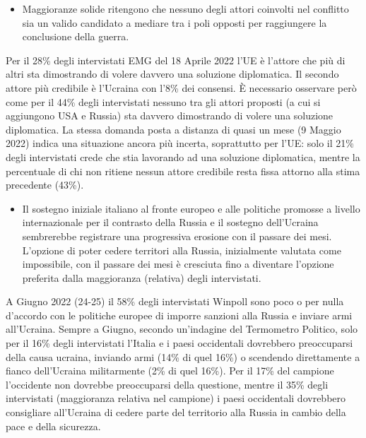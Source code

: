 \documentclass[
]{book}
\providecommand{\tightlist}{%
  \setlength{\itemsep}{0pt}\setlength{\parskip}{0pt}}
\begin{document}
\begin{itemize}
\tightlist
\item
  Maggioranze solide ritengono che nessuno degli attori coinvolti nel conflitto sia un valido candidato a mediare tra i poli opposti per raggiungere la conclusione della guerra.
\end{itemize}

Per il 28\% degli intervistati EMG del 18 Aprile 2022 l'UE è l'attore che più di altri sta dimostrando di volere davvero una soluzione diplomatica. Il secondo attore più credibile è l'Ucraina con l'8\% dei consensi. È necessario osservare però come per il 44\% degli intervistati nessuno tra gli attori proposti (a cui si aggiungono USA e Russia) sta davvero dimostrando di volere una soluzione diplomatica. La stessa domanda posta a distanza di quasi un mese (9 Maggio 2022) indica una situazione ancora più incerta, soprattutto per l'UE: solo il 21\% degli intervistati crede che stia lavorando ad una soluzione diplomatica, mentre la percentuale di chi non ritiene nessun attore credibile resta fissa attorno alla stima precedente (43\%).

\begin{itemize}
\tightlist
\item
  Il sostegno iniziale italiano al fronte europeo e alle politiche promosse a livello internazionale per il contrasto della Russia e il sostegno dell'Ucraina sembrerebbe registrare una progressiva erosione con il passare dei mesi. L'opzione di poter cedere territori alla Russia, inizialmente valutata come impossibile, con il passare dei mesi è cresciuta fino a diventare l'opzione preferita dalla maggioranza (relativa) degli intervistati.
\end{itemize}

A Giugno 2022 (24-25) il 58\% degli intervistati Winpoll sono poco o per nulla d'accordo con le politiche europee di imporre sanzioni alla Russia e inviare armi all'Ucraina. Sempre a Giugno, secondo un'indagine del Termometro Politico, solo per il 16\% degli intervistati l'Italia e i paesi occidentali dovrebbero preoccuparsi della causa ucraina, inviando armi (14\% di quel 16\%) o scendendo direttamente a fianco dell'Ucraina militarmente (2\% di quel 16\%). Per il 17\% del campione l'occidente non dovrebbe preoccuparsi della questione, mentre il 35\% degli intervistati (maggioranza relativa nel campione) i paesi occidentali dovrebbero consigliare all'Ucraina di cedere parte del territorio alla Russia in cambio della pace e della sicurezza.
\end{document}
